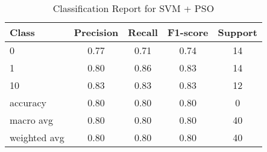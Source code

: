 \begin{table}[ht]
\centering
\caption{Classification Report for SVM + PSO}
\begin{tabular}{l|ccc|c}
\toprule
Class & Precision & Recall & F1-score & Support \\
\midrule
0 & 0.77 & 0.71 & 0.74 & 14 \\
1 & 0.80 & 0.86 & 0.83 & 14 \\
10 & 0.83 & 0.83 & 0.83 & 12 \\
\midrule
accuracy & 0.80 & 0.80 & 0.80 & 0 \\
\midrule
macro avg & 0.80 & 0.80 & 0.80 & 40 \\
\midrule
weighted avg & 0.80 & 0.80 & 0.80 & 40 \\
\bottomrule
\end{tabular}
\end{table}
